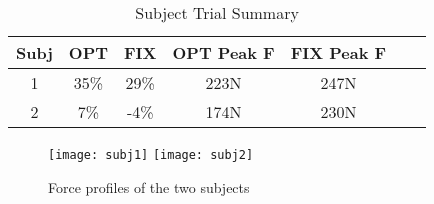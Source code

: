 \begin{table}
\centering
\begin{tabular}{ |c|c|c|c|c|c|c| } 
 \hline
 Subj & OPT & FIX & OPT Peak F & FIX Peak F\\ 
 \hline
 1 & 35\% & 29\% & 223N & 247N\\
 2 & 7\% & -4\% & 174N & 230N \\
 \hline
\end{tabular}%
\caption{Subject Trial Summary}
\label{fig:expsummary}
\end{table}

\begin{figure}[t]
\centering
\texttt{[image: subj1]}\hfill
\texttt{[image: subj2]}
\caption{Force profiles of the two subjects}
\label{fig:forceprofile}
\end{figure}